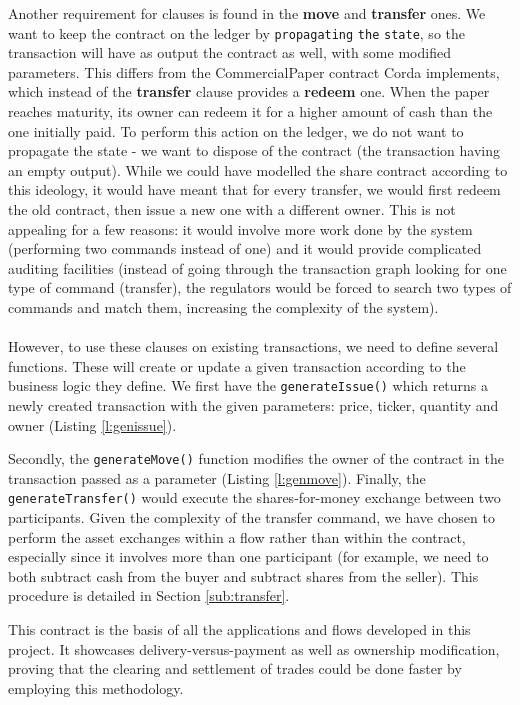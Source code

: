 \documentclass[12pt,twoside]{article}
\begin{document}
Another requirement for clauses is found in the \textbf{move} and \textbf{transfer} ones. We want to keep the contract on the ledger by \verb|propagating| \verb|the| \verb|state|, so the transaction will have as output the contract as well, with some modified parameters. This differs from the CommercialPaper contract Corda implements, which instead of the \textbf{transfer} clause provides a \textbf{redeem} one. When the paper reaches maturity, its owner can redeem it for a higher amount of cash than the one initially paid. To perform this action on the ledger, we do not want to propagate the state - we want to dispose of the contract (the transaction having an empty output). While we could have modelled the share contract according to this ideology, it would have meant that for every transfer, we would first redeem the old contract, then issue a new one with a different owner. This is not appealing for a few reasons: it would involve more work done by the system (performing two commands instead of one) and it would provide complicated auditing facilities (instead of going through the transaction graph looking for one type of command (transfer), the regulators would be forced to search two types of commands and match them, increasing the complexity of the system).
\\ \\
However, to use these clauses on existing transactions, we need to define several functions. These will create or update a given transaction according to the business logic they define. We first have the \verb|generateIssue()| which returns a newly created transaction with the given parameters: price, ticker, quantity and owner (Listing \ref{l:genissue}).

Secondly, the \verb|generateMove()| function modifies the owner of the contract in the transaction passed as a parameter (Listing \ref{l:genmove}). Finally, the \verb|generateTransfer()| would execute the shares-for-money exchange between two participants. Given the complexity of the transfer command, we have chosen to perform the asset exchanges within a flow rather than within the contract, especially since it involves more than one participant (for example, we need to both subtract cash from the buyer and subtract shares from the seller). This procedure is detailed in Section \ref{sub:transfer}.

This contract is the basis of all the applications and flows developed in this project. It showcases delivery-versus-payment as well as ownership modification, proving that the clearing and settlement of trades could be done faster by employing this methodology.
\end{document}
